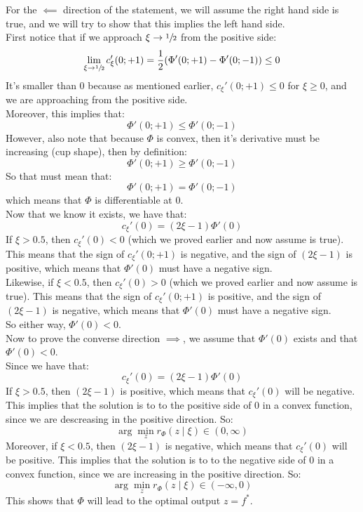 \documentclass[12pt]{article}
\begin{document}
For the $\impliedby$ direction of the statement,
we will assume the right hand side is true,
and we will try to show that this implies 
the left hand side. \\
First notice that
if we approach $\xi \to \sfrac{1}{2}$
from the positive side:
\[ \lim_{\xi \to \sfrac{1}{2}} c_\xi'(0; +1) = 
\dfrac{1}{2}(\Phi'(0; +1) - \Phi'(0; -1)) \leq 0 \]
It's smaller than $0$ because as mentioned
earlier, $c_\xi'(0; +1) \leq 0$ for $\xi \geq 0$,
and we are approaching from the positive side. \\
Moreover, this implies that:
\[\Phi'(0; +1) \leq \Phi'(0; -1)\]
However, also note that because $\Phi$
is convex, then it's derivative must be increasing
(cup shape), then by definition:
\[\Phi'(0; +1) \geq \Phi'(0; -1)\]
So that must mean that:
\[\Phi'(0; +1) = \Phi'(0; -1)\]
which means that $\Phi$ is differentiable at $0$. \\
Now that we know it exists, we have that:
\[ c_\xi'(0) = (2\xi - 1)\Phi'(0) \] 
If $\xi > 0.5$,
then $c_\xi'(0) < 0$
(which we proved earlier and now assume is true).
This means that the sign of $c_\xi'(0; +1) $
is negative, 
and the sign of $(2\xi - 1)$ is positive,
which means that $\Phi'(0)$ must have a 
negative sign. \\
Likewise, if $\xi < 0.5$,
then $c_\xi'(0) > 0$
(which we proved earlier and now assume is true).
This means that the sign of $c_\xi'(0; +1) $
is positive, 
and the sign of $(2\xi - 1)$ is negative,
which means that $\Phi'(0)$ must have a negative sign. \\
So either way, $\Phi'(0) < 0$. \\

Now to prove the converse direction $\implies$,
we assume that $\Phi'(0)$ exists
and that $\Phi'(0) < 0$. \\
Since we have that:
\[ c_\xi'(0) = (2\xi - 1)\Phi'(0) \] 
If $\xi > 0.5$,
then $(2\xi - 1)$ is positive,
which means that $c_\xi'(0)$ will be negative.
This implies that the solution is to to
the positive side of $0$ in a convex function,
since we are descreasing in the positive direction.
So:
\[ \arg \min_z r_\Phi(z \mid \xi) \in (0, \infty)\]
Moreover, if $\xi < 0.5$,
then $(2\xi - 1)$ is negative,
which means that $c_\xi'(0)$ will be positive.
This implies that the solution is to to
the negative side of $0$ in a convex function,
since we are increasing in the positive direction.
So:
\[ \arg \min_z r_\Phi(z \mid \xi) \in (-\infty, 0) \]
This shows that $\Phi$
will lead to the optimal output $z = f^*$. \\
\end{document}
